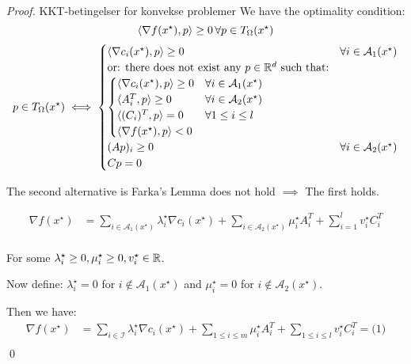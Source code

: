 \begin{proof}{KKT-betingelser for konvekse problemer}{}
	We have the optimality condition:
	\[
		\langle\nabla f(x^\star), p\rangle \geq 0 \, \forall p \in T_{\Omega}(x^\star)
	\]
	\medskip
	\begin{align*}
		p \in T_{\Omega}(x^\star) \iff
		\begin{cases}
			\langle\nabla c_i (x^\star), p \rangle\geq 0                             & \forall i \in \mathcal{A}_1(x^\star) \\
			\text{or: there does not exist any } p \in \mathbb{R}^d \text{ such that:} &                                      \\
			\begin{cases}
				\langle\nabla c_i (x^\star), p \rangle\geq 0 & \forall i \in \mathcal{A}_1(x^\star) \\
				\langle A_i^T , p \rangle\geq 0               & \forall i \in \mathcal{A}_2(x^\star) \\
				\langle (C_i )^T, p \rangle = 0              & \forall 1 \leq i \leq l              \\
				\langle\nabla f (x^\star), p \rangle < 0     &
			\end{cases}                             \\
			(Ap)_i \geq 0                                                      & \forall i \in \mathcal{A}_2(x^\star) \\
			Cp = 0                                                             &
		\end{cases}
	\end{align*}

	The second alternative is Farka's Lemma does not hold \(\implies\) The first holds.

	\begin{align*}
		\nabla f(x^\star) & = \sum_{i\in \mathcal{A}_1(x^\star)} \lambda_i^\star \nabla c_i(x^\star) + \sum_{i \in \mathcal{A}_2(x^\star)} \mu_i^\star A_i^T + \sum_{i=1}^l v_i^\star C_i^T \\
	\end{align*}

	For some  \(\lambda_i^\star \geq 0, \mu_i^\star \geq 0, v_i^\star \in \mathbb{R}\).

	Now define: \(\lambda_i^\star = 0 \) for \(i \notin \mathcal{A}_1(x^\star)\) and \(\mu_i^\star = 0\) for \(i \notin \mathcal{A}_2(x^\star)\).

	Then we have:
	\begin{align*}
		\nabla f(x^\star) & = \sum_{i\in \mathcal{I}} \lambda_i^\star \nabla c_i(x^\star) + \sum_{1 \leq i \leq m} \mu_i^\star A_i^T + \sum_{1 \leq i \leq l} v_i^\star C_i^T = \text{(1)} \\
	\end{align*}
	\qed
\end{proof}

